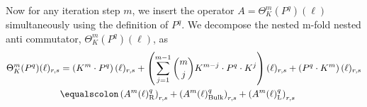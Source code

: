 \documentclass[sn-mathphys, Numbered ,a4paper]{sn-jnl}%
\DeclareMathOperator{\Z}{\mathbb{Z}}
\theoremstyle{plain}
\theoremstyle{definition}
\theoremstyle{remark}
\theoremstyle{plain}
\theoremstyle{definition}
\theoremstyle{remark}
\begin{document}
Now for any iteration step $m$, we insert the operator $A= \Theta^m_K(P^q)(\ell)$ simultaneously using the definition of $P^q$. We decompose the nested m-fold nested anti commutator, $\Theta^m_K(P^q)(\ell)$,  as
\begin{align}
    \Theta^m_K(P^q)(\ell)_{r,s} &= \left(K^m\cdot P^q\right)(\ell )_{r,s} +\left(\sum\limits_{j=1}^{m-1} {{m}\choose j}K^{m-j}\cdot P^q\cdot K^{j}\right)(\ell)_{r,s} + \left(P^q\cdot K^m\right)(\ell)_{r,s}\\ 
    &\equalscolon \left(A^m(\ell)^q_\mathrm{R}\right)_{r,s} +\left(A^m(\ell)^q_\mathrm{Bulk}\right)_{r,s}+\left(A^m(\ell)^q_\mathrm{L}\right)_{r,s}
\end{align}
\begin{comment}
When we explicitly put $P^q$, we get the following decomposition of the error terms corresponding to momentum fixing at the very right, at all the intermediate positions and the very left, respectively.
\begin{alignat}{2}
   E_{Q_1}(\Theta^m_K(P^q)) &= 
  \sum\limits_{\ell, \ell_1\in \Z^3_*}\sum\limits_{\substack{r \in L_{\ell}\\r_1,s_1\in L_{\ell_1}}}\mathds{1}_{L_\ell}(q) K^{m}(\ell)_{r,q}K(\ell_1)_{r_1,s_1}\begin{aligned}[t]
&\Big(b^*_{q}(\ell)\{\epsilon_{r_1,r}(\ell_1.\ell), b^*_{-s_1}(-\ell_1)\} \\ &+ \{\epsilon_{r_1,r}(\ell_1.\ell), b_{-s_1}(-\ell_1)\}b_{q}(\ell)\Big)
    \end{aligned}\nonumber\\
  &\quad +\sum\limits_{\ell, \ell_1\in \Z^3_*}\begin{aligned}[t]
    & \sum\limits_{\substack{r,s \in L_{\ell}\\r_1,s_1\in L_{\ell_1}}} \mathds{1}_{L_\ell}(q)\bigg(\sum_{j=1}^{m-1}K^{m-j}(\ell)_{r,q}K^{j}(\ell)_{q,s}\bigg)K(\ell_1)_{r_1,s_1}\times \\ \times &\Big(b^*_{s}(\ell)\{\epsilon_{r_1,r}(\ell_1.\ell), b^*_{-s_1}(-\ell_1)\} + \{\epsilon_{r_1,r}(\ell_1.\ell), b_{-s_1}(-\ell_1)\}b_{s}(\ell)\Big)
    \end{aligned}\nonumber\\
    &\quad + \sum\limits_{\ell, \ell_1\in \Z^3_*}\sum\limits_{\substack{s \in L_{\ell}\\r_1,s_1\in L_{\ell_1}}} \mathds{1}_{L_\ell}(q) K^{m}(\ell)_{q,s}K(\ell_1)_{r_1,s_1}\begin{aligned}[t]
    &\Big(b^*_{s}(\ell)\{\epsilon_{r_1,q}(\ell_1.\ell), b^*_{-s_1}(-\ell_1)\} \\ &+ \{\epsilon_{r_1,q}(\ell_1.\ell), b_{-s_1}(-\ell_1)\}b_{s}(\ell)\Big).

\end{comment}
\end{document}
